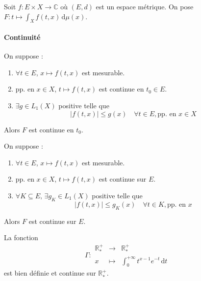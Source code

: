 
  Soit $f : E \times X \rightarrow \mathbb{C}$ où $(E, d)$ est un espace métrique. On pose $F : t \mapsto \int_X f(t, x) \, \mathrm{d}\mu(x)$.

  \paragraph{Continuité}

  \begin{theorem}
    On suppose :
    \begin{enumerate}[label={\bfseries(\roman*)}]
      \item $\forall t \in E$, $x \mapsto f(t,x)$ est mesurable.
      \item pp. en $x \in X$, $t \mapsto f(t,x)$ est continue en $t_0 \in E$.
      \item $\exists g \in L_1(X)$ positive telle que
      \[ |f(t,x)| \leq g(x) \quad \forall t \in E, \text{pp. en } x \in X \]
    \end{enumerate}
    Alors $F$ est continue en $t_0$.
  \end{theorem}

  \begin{corollary}
    On suppose :
    \begin{enumerate}[label={\bfseries(\roman*)}]
      \item $\forall t \in E$, $x \mapsto f(t,x)$ est mesurable.
      \item pp. en $x \in X$, $t \mapsto f(t,x)$ est continue sur $E$.
      \item $\forall K \subseteq E, \, \exists g_K \in L_1(X)$ positive telle que
      \[ |f(t,x)| \leq g_K(x) \quad \forall t \in K, \text{pp. en } x \]
    \end{enumerate}
    Alors $F$ est continue sur $E$.
  \end{corollary}


  \begin{example}
    \label{235-3}
    La fonction
    \[ \Gamma :
    \begin{array}{ccc}
      \mathbb{R}^+_* &\rightarrow& \mathbb{R}^+_* \\
      x &\mapsto& \int_{0}^{+\infty} t^{x-1} e^{-t} \, \mathrm{d}t
    \end{array}
    \]
    est bien définie et continue sur $\mathbb{R}^+_*$.
  \end{example}

